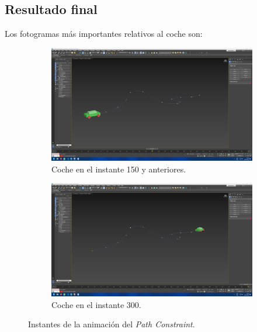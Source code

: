 \newpage

\subsection{Resultado final}

Los fotogramas más importantes relativos al coche son:

\begin{figure}[H]
    \centering
    \begin{subfigure}[t]{0.48\textwidth}
        \centering
        \includegraphics[width=\textwidth]{imagenes/coche/keyframes/150.png}
        \caption{Coche en el instante 150 y anteriores.}
    \end{subfigure}
    \hfill
    \begin{subfigure}[t]{0.48\textwidth}
        \centering
        \includegraphics[width=\textwidth]{imagenes/coche/keyframes/300.png}
        \caption{Coche en el instante 300.}
    \end{subfigure}
    \caption{Instantes de la animación del \textit{Path Constraint}.}
\end{figure}

